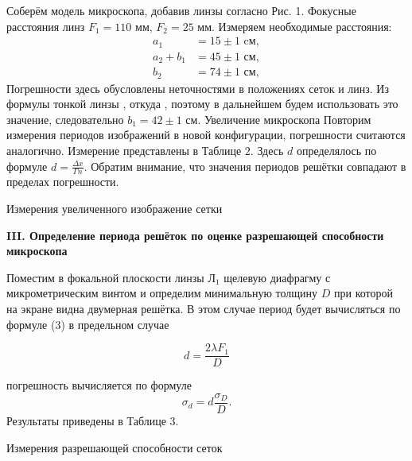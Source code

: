 \documentclass[12pt,a4paper]{article}
\begin{document}
    Соберём модель микроскопа, добавив линзы согласно Рис. 1. Фокусные расстояния линз $F_{1}=  110$ мм, $F_{2}= 25$ мм. Измеряем необходимые расстояния:
        $$
        \begin{aligned}
        a_{1} &= 15  \pm 1 \text{ cм}, \\
        a_{2}+b_{1} &= 45 \pm 1 \text{ см}, \\
        b_{2} &= 74 \pm 1 \text{ см},
        \end{aligned}
        $$
    Погрешности здесь обусловлены неточностями в положениях сеток и линз. Из формулы тонкой линзы , откуда , поэтому в дальнейшем будем использовать это значение, следовательно $b_{1}= 42\pm 1$ см.  Увеличение микроскопа 
    Повторим измерения периодов изображений в новой конфигурации, погрешности считаются аналогично. Измерение представлены в Таблице $2 .$
    Здесь $d$ определялось по формуле $d=\frac{\Delta x}{\Gamma n}$. Обратим внимание, что значения периодов решётки совпадают в пределах погрешности.


        \begin{table}[h!]
           \centering
           \footnotesize
           
           \caption{Измерения увеличенного изображение сетки}
           \label{tab:t2}
        \end{table}
    


	\begin{center}
		\textbf{III. Определение периода решёток по оценке разрешающей способности микроскопа}
	\end{center}

    Поместим в фокальной плоскости линзы $\text{Л}_{1}$ щелевую диафрагму с микрометрическим винтом и определим минимальную толщину $D$ при которой на экране видна двумерная решётка. В этом случае период будет вычисляться по формуле (3) в предельном случае
    
        \begin{equation}
            d=\frac{2 \lambda F_{1}}{D}
        \end{equation}
    
    погрешность вычисляется по формуле
    $$
    \sigma_{d}=d \frac{\sigma_{D}}{D} .
    $$
    Результаты приведены в Таблице $3 .$

        \begin{table}[h!]
           \centering
           \footnotesize
           
           \caption{Измерения разрешающей способности сеток}
           \label{tab:t3}
        \end{table}
\end{document}
